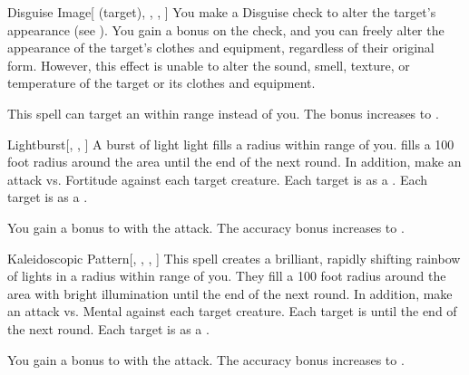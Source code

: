 \lowercase{\hypertarget{spell:Disguise Image}{}}\label{spell:Disguise Image}
\begin{attuneability}[Rank 3]{\hypertarget{spell:Disguise Image}{Disguise Image}}[ (target), , , ]
You make a Disguise check to alter the target's appearance (see ).
You gain a  bonus on the check, and you can freely alter the appearance of the target's clothes and equipment, regardless of their original form.
However, this effect is unable to alter the sound, smell, texture, or temperature of the target or its clothes and equipment.

\rankline
{} This spell can target an  within \rngmed range instead of you.
 The bonus increases to .

\end{attuneability}
\vspace{0.25em}



\lowercase{\hypertarget{spell:Lightburst}{}}\label{spell:Lightburst}
\begin{freeability}[Rank 3]{\hypertarget{spell:Lightburst}{Lightburst}}[, , ]
A burst of light light fills a \areasmall radius  within \rngmed range of you.
 fills a 100 foot radius around the area until the end of the next round.
In addition, make an attack vs. Fortitude against each target creature.
\hit Each target is \dazzled as a .
\crit Each target is  as a .

\rankline
{} You gain a  bonus to  with the attack.
 The accuracy bonus increases to .

\end{freeability}
\vspace{0.25em}



\lowercase{\hypertarget{spell:Kaleidoscopic Pattern}{}}\label{spell:Kaleidoscopic Pattern}
\begin{freeability}[Rank 4]{\hypertarget{spell:Kaleidoscopic Pattern}{Kaleidoscopic Pattern}}[, , , ]
This spell creates a brilliant, rapidly shifting rainbow of lights in a \areamed radius within \rngmed range of you.
They fill a 100 foot radius around the area with bright illumination until the end of the next round.
In addition, make an attack vs. Mental against each target creature.
\hit Each target is  until the end of the next round.
\crit Each target is  as a .

\rankline
{} You gain a  bonus to  with the attack.
 The accuracy bonus increases to .

\end{freeability}
\vspace{0.25em}




